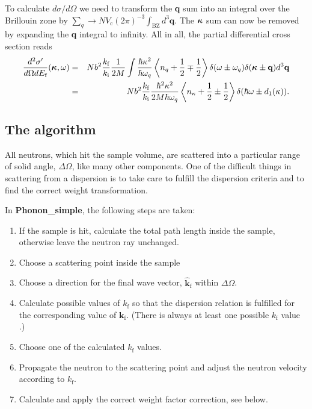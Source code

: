 To calculate $d\sigma/d\Omega$ we need to transform the
\textbf{q} sum into an integral over the Brillouin zone by
$\sum_q \rightarrow N V_\textrm{c} (2\pi)^{-3} \int_\textrm{BZ} d^3\textbf{q}$.
The $\mbox{\boldmath $\kappa$}$ sum can now be removed by
expanding the \textbf{q} integral to infinity.
All in all, the partial differential cross section reads
\begin{eqnarray}
\frac{d^2\sigma'}{d\Omega dE_\textrm{f}}
  (\mbox{\boldmath $\kappa$},\omega) &=&
  N b^2 \frac{k_\textrm{f}}{k_\textrm{i}} \frac{1}{2M}
  \int \frac{\hbar \kappa^2}{\hbar \omega_q}
  \left\langle n_{q}+\frac{1}{2}\mp\frac{1}{2} \right\rangle
  \delta(\omega\pm\omega_{q}) \delta(\mbox{\boldmath $\kappa$}\pm\textbf{q})
   d^3\textbf{q} \nonumber \\
 &=& N b^2 \frac{k_\textrm{f}}{k_\textrm{i}}
          \frac{\hbar^2 \kappa^2}{2M \hbar \omega_q}
  \left\langle n_{\kappa}+\frac12\pm\frac12 \right\rangle
  \delta(\hbar\omega\pm d_1(\kappa)) . \label{e:phonon-pdcross}
\end{eqnarray}

\subsection{The algorithm}
All neutrons, which hit the sample volume, are scattered
into a particular range of solid angle, $\Delta \Omega$,
like many other components. One of the difficult things in
scattering from a dispersion is to take care to fulfill the
dispersion criteria and to find the correct weight transformation.

In \textbf{Phonon\_simple}, the following steps are taken:
\begin{enumerate}
\item If the sample is hit, calculate the total path length inside the
sample, otherwise leave the neutron ray unchanged.
\item Choose a scattering point inside the sample
\item Choose a direction for the final wave vector, $\hat{\textbf{k}}_\textrm{f}$
within $\Delta\Omega$.
\item Calculate possible values of $k_\textrm{f}$ so that the
dispersion relation is fulfilled for the corresponding value
of $\textbf{k}_\textrm{f}$. (There is always at least one possible $k_\textrm{f}$
value \cite{bacon}.)
\item Choose one of the calculated $k_\textrm{f}$ values.
\item Propagate the neutron to the scattering point and adjust the
neutron velocity according to $k_\textrm{f}$.
\item Calculate and apply the correct weight factor correction, see below.
\end{enumerate}

